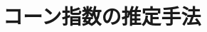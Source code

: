 \documentclass[../main]{subfiles}
\begin{document}
\graphicspath{{../figures/chap3/}}

\section{コーン指数の推定手法}
\label{sec:pmethod_estimation}
\end{document}
